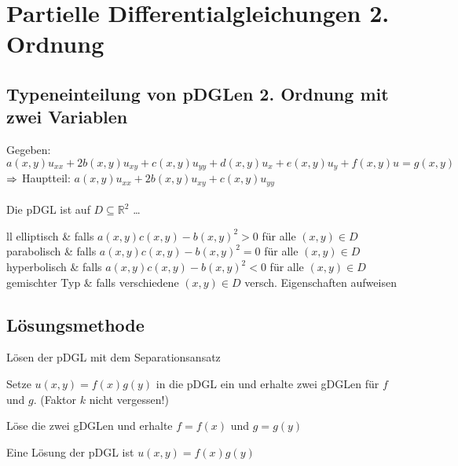 \documentclass[german,color,5pt]{latex4ei/latex4ei_fs}
\begin{document}
\section{Partielle Differentialgleichungen 2. Ordnung}
\begin{sectionbox}
	\subsection{Typeneinteilung von pDGLen 2. Ordnung mit zwei Variablen}
	Gegeben: $a(x,y)u_{xx}+2b(x,y)u_{xy}+c(x,y)u_{yy}+d(x,y)u_{x}+e(x,y)u_{y}+f(x,y)u=g(x,y)$\\
	$\Rightarrow$ Hauptteil: $a(x,y)u_{xx}+2b(x,y)u_{xy}+c(x,y)u_{yy}$ \\ \\
	Die pDGL ist auf $D\subseteq \mathbb{R}^2$ \dots
	\begin{tablebox}{ll}
		elliptisch & falls $a(x,y)c(x,y)-b(x,y)^2>0 $ für alle $(x,y) \in D $ \\
		parabolisch & falls $a(x,y)c(x,y)-b(x,y)^2=0 $ für alle $(x,y) \in D $ \\
		hyperbolisch & falls $a(x,y)c(x,y)-b(x,y)^2<0 $ für alle $(x,y) \in D $ \\
		gemischter Typ & falls verschiedene $(x,y) \in D $ versch. Eigenschaften aufweisen
	\end{tablebox}
\end{sectionbox}

\begin{sectionbox}
	\subsection{Lösungsmethode}
	\label{subsubsec:separationsansatz}
	\begin{cookbox}{Lösen der pDGL mit dem Separationsansatz}
		\item Setze $u(x,y)=f(x)g(y) $ in die pDGL ein und erhalte zwei gDGLen für $f$ und $g$. (Faktor $k$ nicht vergessen!)
		\item Löse die zwei gDGLen und erhalte $f=f(x)$ und $g=g(y) $
		\item Eine Lösung der pDGL ist $u(x,y)=f(x)g(y) $
	\end{cookbox}
\end{sectionbox}

\end{document}
